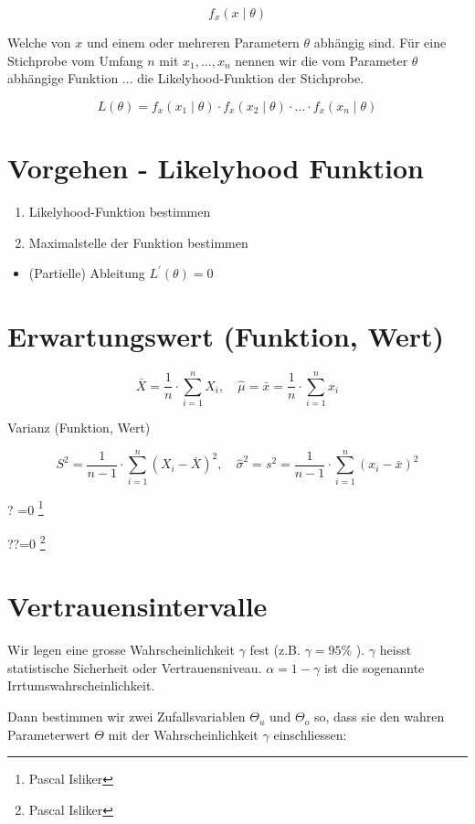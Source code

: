 \documentclass[10pt]{article}
\let\svthefootnote\thefootnote
\newcommand\blfootnotetext[1]{%
  \let\thefootnote\relax\footnote{#1}%
  \addtocounter{footnote}{-1}%
  \let\thefootnote\svthefootnote%
}
\let\svfootnotetext\footnotetext
\renewcommand\footnotetext[2][?]{%
  \if\relax#1\relax%
    \ifnum\value{footnote}=0\blfootnotetext{#2}\else\svfootnotetext{#2}\fi%
  \else%
    \if?#1\ifnum\value{footnote}=0\blfootnotetext{#2}\else\svfootnotetext{#2}\fi%
    \else\svfootnotetext[#1]{#2}\fi%
  \fi
}
\begin{document}
$$
f_{x}(x \mid \theta)
$$

Welche von $x$ und einem oder mehreren Parametern $\theta$ abhängig sind. Für eine Stichprobe vom Umfang $n$ mit $x_{1}, \ldots, x_{n}$ nennen wir die vom Parameter $\theta$ abhängige Funktion ... die Likelyhood-Funktion der Stichprobe.

$$
L(\theta)=f_{x}\left(x_{1} \mid \theta\right) \cdot f_{x}\left(x_{2} \mid \theta\right) \cdot \ldots \cdot f_{x}\left(x_{n} \mid \theta\right)
$$

\section*{Vorgehen - Likelyhood Funktion}
\begin{enumerate}
  \item Likelyhood-Funktion bestimmen
  \item Maximalstelle der Funktion bestimmen
\end{enumerate}

\begin{itemize}
  \item (Partielle) Ableitung $L^{\prime}(\theta)=0$
\end{itemize}

\section*{Erwartungswert (Funktion, Wert)}
$$
\bar{X}=\frac{1}{n} \cdot \sum_{i=1}^{n} X_{i}, \quad \hat{\mu}=\bar{x}=\frac{1}{n} \cdot \sum_{i=1}^{n} x_{i}
$$

Varianz (Funktion, Wert)

$$
S^{2}=\frac{1}{n-1} \cdot \sum_{i=1}^{n}\left(X_{i}-\bar{X}\right)^{2}, \quad \hat{\sigma}^{2}=s^{2}=\frac{1}{n-1} \cdot \sum_{i=1}^{n}\left(x_{i}-\bar{x}\right)^{2}
$$

\section*{Vertrauensintervalle}
Wir legen eine grosse Wahrscheinlichkeit $\gamma$ fest (z.B. $\gamma=95 \%$ ). $\gamma$ heisst statistische Sicherheit oder Vertrauensniveau. $\alpha=1-\gamma$ ist die sogenannte Irrtumswahrscheinlichkeit.

Dann bestimmen wir zwei Zufallsvariablen $\Theta_{u}$ und $\Theta_{o}$ so, dass sie den wahren Parameterwert $\Theta$ mit der Wahrscheinlichkeit $\gamma$ einschliessen:
\end{document}
